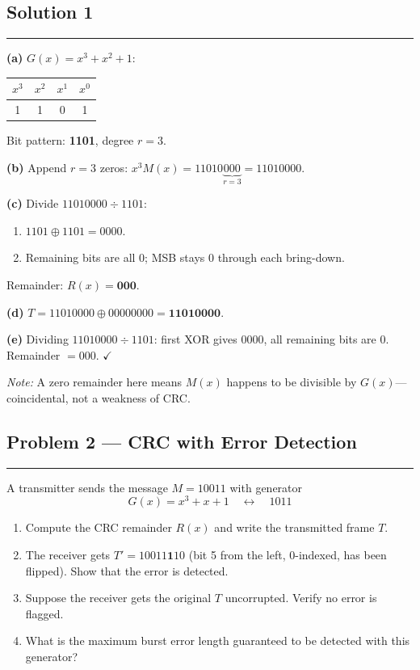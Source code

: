 \documentclass[12pt]{article}
\begin{document}
\subsection*{Solution 1}
\hrule\medskip
\textbf{(a)} $G(x) = x^3 + x^2 + 1$:

\begin{center}
\begin{tabular}{cccc}
\toprule
$x^3$ & $x^2$ & $x^1$ & $x^0$ \\
\midrule
1 & 1 & 0 & 1 \\
\bottomrule
\end{tabular}
\end{center}

Bit pattern: \textbf{1101}, degree $r = 3$.

\medskip
\textbf{(b)} Append $r = 3$ zeros: $x^3 M(x) = 11010\underbrace{000}_{r=3} = 11010000$.

\medskip
\textbf{(c)} Divide $11010000 \div 1101$:

\begin{enumerate}
  \item $1101 \oplus 1101 = 0000$.
  \item Remaining bits are all 0; MSB stays 0 through each bring-down.
\end{enumerate}

Remainder: $R(x) = \mathbf{000}$.

\medskip
\textbf{(d)} $T = 11010000 \oplus 00000000 = \mathbf{11010000}$.

\medskip
\textbf{(e)} Dividing $11010000 \div 1101$: first XOR gives $0000$, all remaining bits are 0. Remainder $= 000$. $\checkmark$

\textit{Note:} A zero remainder here means $M(x)$ happens to be divisible by $G(x)$---coincidental, not a weakness of CRC.
\bigskip

\bigskip

\subsection*{Problem 2 --- CRC with Error Detection}
\hrule\medskip
A transmitter sends the message $M = 10011$ with generator
\[
  G(x) = x^3 + x + 1 \quad \longleftrightarrow \quad 1011
\]
\begin{enumerate}[label=(\alph*)]
  \item Compute the CRC remainder $R(x)$ and write the transmitted frame $T$.
  \item The receiver gets $T' = 10011\mathbf{1}10$ (bit 5 from the left, 0-indexed, has been flipped). Show that the error is detected.
  \item Suppose the receiver gets the original $T$ uncorrupted. Verify no error is flagged.
  \item What is the maximum burst error length guaranteed to be detected with this generator?
\end{enumerate}
\bigskip
\end{document}
